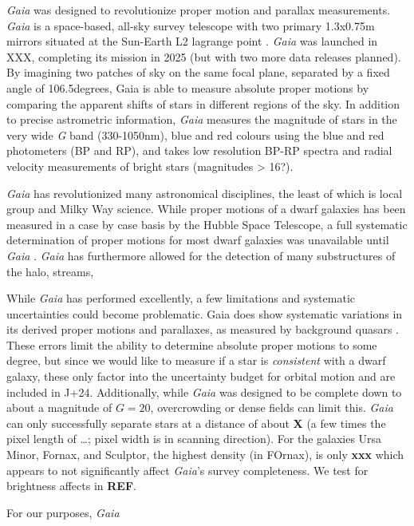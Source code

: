 \emph{Gaia} was designed to revolutionize proper motion and parallax
measurements. \emph{Gaia} is a space-based, all-sky survey telescope
with two primary 1.3x0.75m mirrors situated at the Sun-Earth L2 lagrange
point \citep{gaiacollaboration+2016}. \emph{Gaia} was launched in XXX,
completing its mission in 2025 (but with two more data releases
planned). By imagining two patches of sky on the same focal plane,
separated by a fixed angle of 106.5degrees, Gaia is able to measure
absolute proper motions by comparing the apparent shifts of stars in
different regions of the sky. In addition to precise astrometric
information, \emph{Gaia} measures the magnitude of stars in the very
wide \emph{G} band (330-1050nm), blue and red colours using the blue and
red photometers (BP and RP), and takes low resolution BP-RP spectra and
radial velocity measurements of bright stars (magnitudes \textgreater{}
16?).

\emph{Gaia} has revolutionized many astronomical disciplines, the least
of which is local group and Milky Way science. While proper motions of a
dwarf galaxies has been measured in a case by case basis by the Hubble
Space Telescope, a full systematic determination of proper motions for
most dwarf galaxies was unavailable until \emph{Gaia}
\citep{MV2020a, battaglia+2022}. \emph{Gaia} has furthermore allowed for
the detection of many substructures of the halo, streams,

While \emph{Gaia} has performed excellently, a few limitations and
systematic uncertainties could become problematic. Gaia does show
systematic variations in its derived proper motions and parallaxes, as
measured by background quasars \citep{lindegren+2021}. These errors
limit the ability to determine absolute proper motions to some degree,
but since we would like to measure if a star is \emph{consistent} with a
dwarf galaxy, these only factor into the uncertainty budget for orbital
motion and are included in J+24. Additionally, while \emph{Gaia} was
designed to be complete down to about a magnitude of \(G=20\),
overcrowding or dense fields can limit this. \emph{Gaia} can only
successfully separate stars at a distance of about \textbf{X} (a few
times the pixel length of \ldots; pixel width is in scanning direction).
For the galaxies Ursa Minor, Fornax, and Sculptor, the highest density
(in FOrnax), is only \textbf{xxx} which appears to not significantly
affect \emph{Gaia}'s survey completeness. We test for brightness affects
in \textbf{REF}.

For our purposes, \emph{Gaia}

